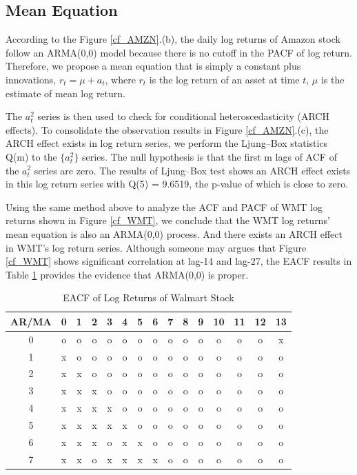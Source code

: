 \documentclass[paper=a4, fontsize=11pt]{article}
\begin{document}
\subsection{Mean Equation}
According to the Figure \ref{cf_AMZN}.(b), the daily log returns of Amazon stock follow an ARMA(0,0) model because there is no cutoff in the PACF of log return. Therefore, we propose a mean equation that is simply a constant plus innovations, $r_t = \mu + a_t$, where $r_t$  is the log return of an asset at time $t$, $\mu$ is the estimate of mean log return. 

The $a_t^2$ series is then used to check for conditional heteroscedasticity (ARCH effects). To consolidate the observation results in Figure \ref{cf_AMZN}.(c), the ARCH effect exists in log return series, we perform the Ljung–Box statistics Q(m) to the $\{a_t^2\}$ series. The null hypothesis is that the first m lags of ACF of the $a_t^2$ series are zero. The results of Ljung–Box test shows an ARCH effect exists in this log return series with Q(5) = 9.6519, the p-value of which is close to zero.

Using the same method above to analyze the ACF and PACF of WMT log returns shown in Figure \ref{cf_WMT}, we conclude that the WMT log returns' mean equation is also an ARMA(0,0) process. And there exists an ARCH effect in WMT's log return series. Although someone may argues that Figure \ref{cf_WMT} shows significant correlation at lag-14 and lag-27, the EACF results in Table \ref{eacf_WMT} provides the evidence that ARMA(0,0) is proper. 

\begin{table}[!htbp] \centering 
  \caption{EACF of Log Returns of Walmart Stock} 
  \label{eacf_WMT} 
\begin{tabular}{c|cccccccccccccc} 
\hline 
\hline
AR/MA & 0 &1 & 2 & 3 & 4 & 5 & 6 & 7 & 8 & 9 & 10 & 11 & 12 & 13\\
\hline 
0 & o & o & o & o & o & o & o & o & o & o & o & o & o & x \\ 
1 & x & o & o & o & o & o & o & o & o & o & o & o & o & o \\ 
2 & x & x & o & o & o & o & o & o & o & o & o & o & o & o \\ 
3 & x & x & x & o & o & o & o & o & o & o & o & o & o & o \\ 
4 & x & x & x & x & o & o & o & o & o & o & o & o & o & o \\ 
5 & x & x & x & x & x & o & o & o & o & o & o & o & o & o \\ 
6 & x & x & x & o & x & x & o & o & o & o & o & o & o & o \\ 
7 & x & x & o & x & x & x & x & o & o & o & o & o & o & o \\ 
\hline
\end{tabular} 
\end{table} 
\end{document}
